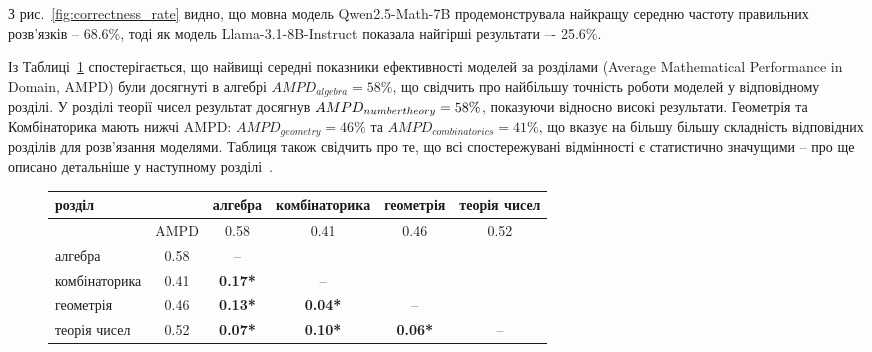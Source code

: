З рис.~\ref{fig:correctness_rate} видно, що мовна модель Qwen2.5-Math-7B продемонструвала найкращу середню частоту правильних розв'язків -- 68.6\%, тоді як модель Llama-3.1-8B-Instruct показала найгірші результати –- 25.6\%.

Із Таблиці~\ref{tab:p_values} спостерігається, що найвищі середні показники ефективності моделей за розділами (Average Mathematical Performance in Domain, AMPD) були досягнуті в алгебрі $AMPD_{algebra} = 58\%$, що свідчить про найбільшу точність роботи моделей у відповідному розділі. У розділі теорії чисел результат досягнув $AMPD_{number\space theory} = 58\%$, показуючи відносно високі результати. Геометрія та Комбінаторика мають нижчі AMPD: $AMPD_{geometry} = 46\%$ та $AMPD_{combinatorics} = 41\%$, що вказує на більшу більшу складність відповідних розділів для розв'язання моделями. Таблиця також свідчить про те, що всі спостережувані відмінності є статистично значущими -- про ще описано детальніше у наступному розділі~.

\begin{figure}[!h]
\centering \small
    \label{tab:p_values}
    \begin{tabular}{|l|c|cccc|}
    \hline
    розділ & & алгебра & комбінаторика & геометрія & теорія чисел \\
    \hline
    & AMPD & 0.58 & 0.41 & 0.46 & 0.52 \\
    \hline
    алгебра & 0.58 & – &  &  &  \\
    комбінаторика & 0.41 & \textbf{0.17*} & – &  &  \\
    геометрія & 0.46 & \textbf{0.13*} & \textbf{0.04*} & – &  \\
    теорія чисел & 0.52 & \textbf{0.07*} & \textbf{0.10*} & \textbf{0.06*} & – \\
    \hline
    \end{tabular}
\end{figure}

